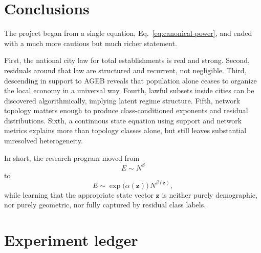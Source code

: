\documentclass[11pt]{article}
\begin{document}
\section{Conclusions}

The project began from a single equation, Eq.~\eqref{eq:canonical-power}, and ended with a much more cautious but much richer statement.

First, the national city law for total establishments is real and strong. Second, residuals around that law are structured and recurrent, not negligible. Third, descending in support to AGEB reveals that population alone ceases to organize the local economy in a universal way. Fourth, lawful subsets inside cities can be discovered algorithmically, implying latent regime structure. Fifth, network topology matters enough to produce class-conditioned exponents and residual distributions. Sixth, a continuous state equation using support and network metrics explains more than topology classes alone, but still leaves substantial unresolved heterogeneity.

In short, the research program moved from
\begin{equation}
E \sim N^\beta
\end{equation}
to
\begin{equation}
E \sim \exp\!\bigl(\alpha(\mathbf{z})\bigr)\,N^{\beta(\mathbf{z})},
\end{equation}
while learning that the appropriate state vector \(\mathbf{z}\) is neither purely demographic, nor purely geometric, nor fully captured by residual class labels.

\appendix

\section{Experiment ledger}
\end{document}
